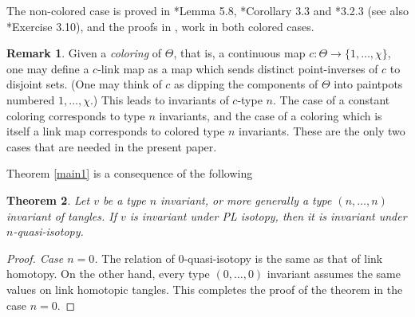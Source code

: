 \documentclass[a4paper,12pt,reqno,oneside]{amsart} %
\theoremstyle{plain}
\newtheorem{theorem}{Theorem}[section]
\theoremstyle{definition}
\newtheorem{remark}[theorem]{Remark}
\theoremstyle{named}
\renewcommand{\:}{\colon}
\begin{document}
The non-colored case is proved in \cite{Gu1}*{Lemma 5.8}, \cite{Wi}*{Corollary 3.3} and \cite{CDM}*{3.2.3} (see also \cite{BN}*{Exercise 3.10}), 
and the proofs in \cite{Wi}, \cite{CDM} work in both colored cases. 

\begin{remark}
Given a {\it coloring} of $\Theta$, that is, a continuous map $c\:\Theta\to\{1,\dots,\chi\}$, one may define 
a $c$-link map as a map which sends distinct point-inverses of $c$ to disjoint sets.
(One may think of $c$ as dipping the components of $\Theta$ into paintpots numbered $1,\dots,\chi$.)
This leads to invariants of $c$-type $n$.
The case of a constant coloring corresponds to type $n$ invariants, and the case of a coloring which is itself 
a link map corresponds to colored type $n$ invariants.
These are the only two cases that are needed in the present paper.
\end{remark}

Theorem \ref{main1} is a consequence of the following

\begin{theorem}\label{2.2}
Let $v$ be a type $n$ invariant, or more generally a type $(n,\dots,n)$ invariant of tangles.
If $v$ is invariant under PL isotopy, then it is invariant under $n$-quasi-isotopy.
\end{theorem}

\begin{proof}[Proof. Case $n=0$] The relation of $0$-quasi-isotopy is the same as that of link homotopy.
On the other hand, every type $(0,\dots,0)$ invariant assumes the same values on link homotopic tangles.
This completes the proof of the theorem in the case $n=0$.
\end{proof}
\end{document}
